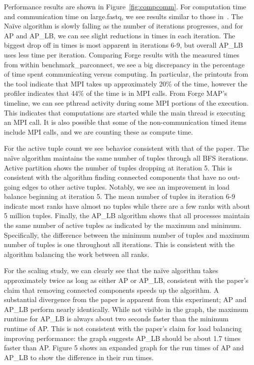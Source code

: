 \documentclass[11pt]{amsart}
\begin{document}
Performance results are shown in Figure~\ref{fig:compcomm}.
For computation time and communication time on large.fastq, we see results similar to those in~\cite{Flick:2015}. The Na{\"i}ve algorithm is slowly falling as the number of iterations progresses, and for AP and AP\_LB, we can see slight reductions in times in each iteration. The biggest drop off in times is most apparent in iterations 6-9, but overall AP\_LB uses less time per iteration. Comparing Forge results with the measured times from within benchmark\_parconnect, we see a big discrepancy in the percentage of time spent communicating versus computing. In particular, the printouts from the tool indicate that MPI takes up approximately 20\% of the time, however the profiler indicates that 44\% of the time is in MPI calls. From Forge MAP's timeline, we can see pthread activity during some MPI portions of the execution. This indicates that computations are started while the main thread is executing an MPI call. It is also possible that some of the non-communication timed items include MPI calls, and we are counting these as compute time.

For the active tuple count we see behavior consistent with that of the paper. The na{\"i}ve algorithm maintains the same number of tuples through all BFS iterations. Active partition shows the number of tuples dropping at iteration 5. This is consistent with the algorithm finding connected components that have no out-going edges to other active tuples. Notably, we see an improvement in load balance beginning at iteration 5. The mean number of tuples in iteration 6-9 indicate most ranks have almost no tuples while there are a few ranks with about 5 million tuples. Finally, the AP\_LB algorithm shows that all processes maintain the same number of active tuples as indicated by the maximum and minimum. Specifically, the difference between the minimum number of tuples and maximum number of tuples is one throughout all iterations. This is consistent with the algorithm balancing the work between all ranks.

For the scaling study, we can clearly see that the na{\"i}ve algorithm takes approximately twice as long as either AP or AP\_LB, consistent with the paper's claim that removing connected components speeds up the algorithm. A substantial divergence from the paper is apparent from this experiment; AP and AP\_LB perform nearly identically. While not visible in the graph, the maximum runtime for AP\_LB is always about two seconds faster than the minimum runtime of AP. This is not consistent with the paper's claim for load balancing improving performance: the graph suggests AP\_LB should be about 1.7 times faster than AP. Figure 5 shows an expanded graph for the run times of AP and AP\_LB to show the difference in their run times.
\end{document}

